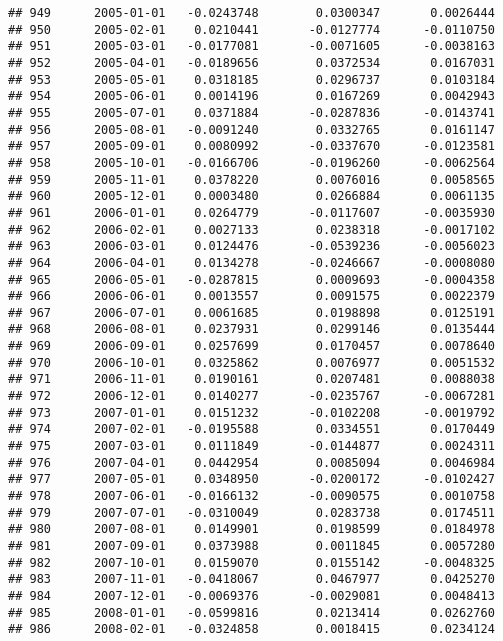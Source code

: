 \documentclass[
]{article}
\begin{document}
\begin{verbatim}
## 949      2005-01-01   -0.0243748        0.0300347       0.0026444
## 950      2005-02-01    0.0210441       -0.0127774      -0.0110750
## 951      2005-03-01   -0.0177081       -0.0071605      -0.0038163
## 952      2005-04-01   -0.0189656        0.0372534       0.0167031
## 953      2005-05-01    0.0318185        0.0296737       0.0103184
## 954      2005-06-01    0.0014196        0.0167269       0.0042943
## 955      2005-07-01    0.0371884       -0.0287836      -0.0143741
## 956      2005-08-01   -0.0091240        0.0332765       0.0161147
## 957      2005-09-01    0.0080992       -0.0337670      -0.0123581
## 958      2005-10-01   -0.0166706       -0.0196260      -0.0062564
## 959      2005-11-01    0.0378220        0.0076016       0.0058565
## 960      2005-12-01    0.0003480        0.0266884       0.0061135
## 961      2006-01-01    0.0264779       -0.0117607      -0.0035930
## 962      2006-02-01    0.0027133        0.0238318      -0.0017102
## 963      2006-03-01    0.0124476       -0.0539236      -0.0056023
## 964      2006-04-01    0.0134278       -0.0246667      -0.0008080
## 965      2006-05-01   -0.0287815        0.0009693      -0.0004358
## 966      2006-06-01    0.0013557        0.0091575       0.0022379
## 967      2006-07-01    0.0061685        0.0198898       0.0125191
## 968      2006-08-01    0.0237931        0.0299146       0.0135444
## 969      2006-09-01    0.0257699        0.0170457       0.0078640
## 970      2006-10-01    0.0325862        0.0076977       0.0051532
## 971      2006-11-01    0.0190161        0.0207481       0.0088038
## 972      2006-12-01    0.0140277       -0.0235767      -0.0067281
## 973      2007-01-01    0.0151232       -0.0102208      -0.0019792
## 974      2007-02-01   -0.0195588        0.0334551       0.0170449
## 975      2007-03-01    0.0111849       -0.0144877       0.0024311
## 976      2007-04-01    0.0442954        0.0085094       0.0046984
## 977      2007-05-01    0.0348950       -0.0200172      -0.0102427
## 978      2007-06-01   -0.0166132       -0.0090575       0.0010758
## 979      2007-07-01   -0.0310049        0.0283738       0.0174511
## 980      2007-08-01    0.0149901        0.0198599       0.0184978
## 981      2007-09-01    0.0373988        0.0011845       0.0057280
## 982      2007-10-01    0.0159070        0.0155142      -0.0048325
## 983      2007-11-01   -0.0418067        0.0467977       0.0425270
## 984      2007-12-01   -0.0069376       -0.0029081       0.0048413
## 985      2008-01-01   -0.0599816        0.0213414       0.0262760
## 986      2008-02-01   -0.0324858        0.0018415       0.0234124

\end{verbatim}
\end{document}
